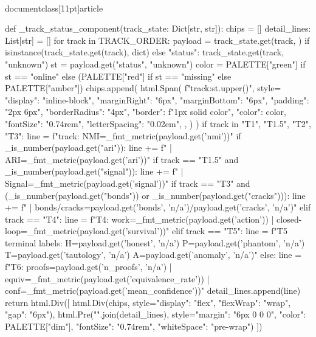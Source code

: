 \\documentclass[11pt]{article}
\begin{document}
\begin{CodeBlock}
{def _track_status_component(track_state: Dict[str, str]):
    chips = []
    detail_lines: List[str] = []
    for track in TRACK_ORDER:
        payload = track_state.get(track, {}) if isinstance(track_state.get(track), dict) else {"status": track_state.get(track, "unknown")}
        st = payload.get("status", "unknown")
        color = PALETTE["green"] if st == "online" else (PALETTE["red"] if st == "missing" else PALETTE["amber"])
        chips.append(
            html.Span(
                f"{track}:{st.upper()}",
                style={
                    "display": "inline-block",
                    "marginRight": "6px",
                    "marginBottom": "6px",
                    "padding": "2px 6px",
                    "borderRadius": "4px",
                    "border": f"1px solid {color}",
                    "color": color,
                    "fontSize": "0.74rem",
                    "letterSpacing": "0.02em",
                },
            )
        )
        if track in {"T1", "T1.5", "T2", "T3"}:
            line = f"{track}: NMI={_fmt_metric(payload.get('nmi'))}"
            if _is_number(payload.get("ari")):
                line += f" | ARI={_fmt_metric(payload.get('ari'))}"
            if track == "T1.5" and _is_number(payload.get("signal")):
                line += f" | Signal={_fmt_metric(payload.get('signal'))}"
            if track == "T3" and (_is_number(payload.get("bonds")) or _is_number(payload.get("cracks"))):
                line += f" | bonds/cracks={payload.get('bonds', 'n/a')}/{payload.get('cracks', 'n/a')}"
        elif track == "T4":
            line = f"T4: work={_fmt_metric(payload.get('action'))} | closed-loop={_fmt_metric(payload.get('survival'))}"
        elif track == "T5":
            line = f"T5 terminal labels: H={payload.get('honest', 'n/a')} P={payload.get('phantom', 'n/a')} T={payload.get('tautology', 'n/a')} A={payload.get('anomaly', 'n/a')}"
        else:
            line = f"T6: proofs={payload.get('n_proofs', 'n/a')} | equiv={_fmt_metric(payload.get('equivalence_rate'))} | conf={_fmt_metric(payload.get('mean_confidence'))}"
        detail_lines.append(line)
    return html.Div([
        html.Div(chips, style={"display": "flex", "flexWrap": "wrap", "gap": "6px"}),
        html.Pre("\n".join(detail_lines), style={"margin": "6px 0 0 0", "color": PALETTE["dim"], "fontSize": "0.74rem", "whiteSpace": "pre-wrap"})
    ])


}
\end{CodeBlock}
\end{document}
